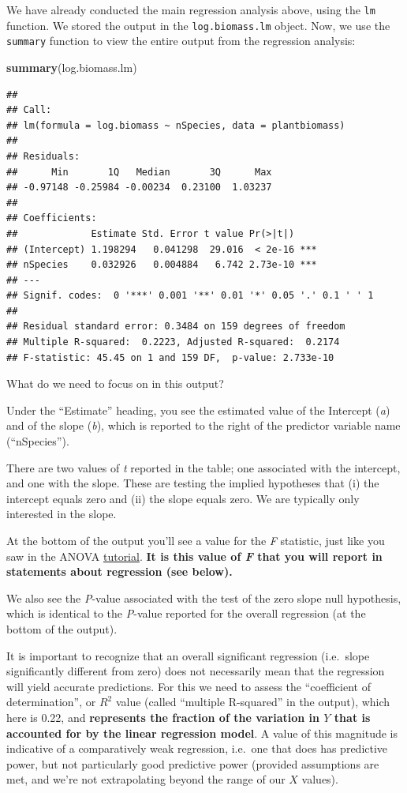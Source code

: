 \documentclass[
]{book}
\newenvironment{Shaded}{\begin{snugshade}}{\end{snugshade}}
\newcommand{\FunctionTok}[1]{\textcolor[rgb]{0.13,0.29,0.53}{\textbf{#1}}}
\newcommand{\NormalTok}[1]{#1}
\begin{document}
We have already conducted the main regression analysis above, using the \texttt{lm} function. We stored the output in the \texttt{log.biomass.lm} object. Now, we use the \texttt{summary} function to view the entire output from the regression analysis:

\begin{Shaded}
\begin{Highlighting}[]
\FunctionTok{summary}\NormalTok{(log.biomass.lm)}
\end{Highlighting}
\end{Shaded}

\begin{verbatim}
## 
## Call:
## lm(formula = log.biomass ~ nSpecies, data = plantbiomass)
## 
## Residuals:
##      Min       1Q   Median       3Q      Max 
## -0.97148 -0.25984 -0.00234  0.23100  1.03237 
## 
## Coefficients:
##             Estimate Std. Error t value Pr(>|t|)    
## (Intercept) 1.198294   0.041298  29.016  < 2e-16 ***
## nSpecies    0.032926   0.004884   6.742 2.73e-10 ***
## ---
## Signif. codes:  0 '***' 0.001 '**' 0.01 '*' 0.05 '.' 0.1 ' ' 1
## 
## Residual standard error: 0.3484 on 159 degrees of freedom
## Multiple R-squared:  0.2223, Adjusted R-squared:  0.2174 
## F-statistic: 45.45 on 1 and 159 DF,  p-value: 2.733e-10
\end{verbatim}

What do we need to focus on in this output?

Under the ``Estimate'' heading, you see the estimated value of the Intercept (\emph{a}) and of the slope (\emph{b}), which is reported to the right of the predictor variable name (``nSpecies'').

There are two values of \emph{t} reported in the table; one associated with the intercept, and one with the slope. These are testing the implied hypotheses that (i) the intercept equals zero and (ii) the slope equals zero. We are typically only interested in the slope.

At the bottom of the output you'll see a value for the \emph{F} statistic, just like you saw in the ANOVA \hyperref[do_anova1]{tutorial}. \textbf{It is this value of \emph{F} that you will report in statements about regression (see below).}

We also see the \emph{P}-value associated with the test of the zero slope null hypothesis, which is identical to the \emph{P}-value reported for the overall regression (at the bottom of the output).

It is important to recognize that an overall significant regression (i.e.~slope significantly different from zero) does not necessarily mean that the regression will yield accurate predictions. For this we need to assess the ``coefficient of determination'', or \(R^2\) value (called ``multiple R-squared'' in the output), which here is 0.22, and \textbf{represents the fraction of the variation in \(Y\) that is accounted for by the linear regression model}. A value of this magnitude is indicative of a comparatively weak regression, i.e.~one that does has predictive power, but not particularly good predictive power (provided assumptions are met, and we're not extrapolating beyond the range of our \(X\) values).
\end{document}

